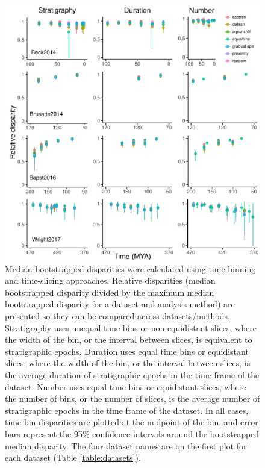 \documentclass[12pt,a4paper]{article}
\begin{document}
  \begin{figure}[!htbp]
    \centering
    \includegraphics[width=1\linewidth, height=1\textheight, keepaspectratio]{figures/fig-dtt-epoch-appendix.pdf}
    \caption[Relative disparity through time for four example datasets.]
    {Median bootstrapped disparities were calculated using time binning and time-slicing approaches. 
    Relative disparities (median bootstrapped disparity divided by the maximum median bootstrapped disparity for a dataset and analysis method) are presented so they can be compared across datasets/methods. 
    Stratigraphy uses unequal time bins or non-equidistant slices, where the width of the bin, or the interval between slices, is equivalent to stratigraphic epochs. 
    Duration uses equal time bins or equidistant slices, where the width of the bin, or the interval between slices, is the average duration of stratigraphic epochs in the time frame of the dataset. 
    Number uses equal time bins or equidistant slices, where the number of bins, or the number of slices, is the average number of stratigraphic epochs in the time frame of the dataset. 
    In all cases, time bin disparities are plotted at the midpoint of the bin, and error bars represent the 95\% confidence intervals around the bootstrapped median disparity.
    The four dataset names are on the first plot for each dataset (Table \ref{table:datasets}).}
    \label{figure:dtt2}
  \end{figure}  
\end{document}
